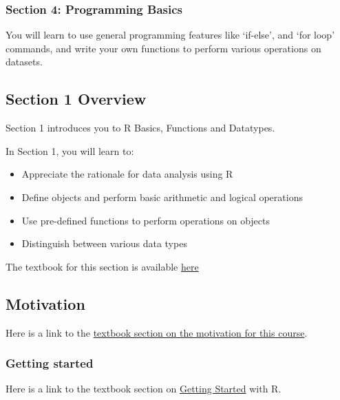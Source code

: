 \documentclass[
]{article}
\providecommand{\tightlist}{%
  \setlength{\itemsep}{0pt}\setlength{\parskip}{0pt}}
\begin{document}
\hypertarget{section-4-programming-basics}{%
\subsubsection{Section 4: Programming
Basics}\label{section-4-programming-basics}}

You will learn to use general programming features like `if-else', and
`for loop' commands, and write your own functions to perform various
operations on datasets.

\hypertarget{section-1-overview}{%
\subsection{Section 1 Overview}\label{section-1-overview}}

Section 1 introduces you to R Basics, Functions and Datatypes.

In Section 1, you will learn to:

\begin{itemize}
\tightlist
\item
  Appreciate the rationale for data analysis using R
\item
  Define objects and perform basic arithmetic and logical operations
\item
  Use pre-defined functions to perform operations on objects
\item
  Distinguish between various data types
\end{itemize}

The textbook for this section is available
\href{https://rafalab.github.io/dsbook/r-basics.html}{here}

\hypertarget{motivation}{%
\subsection{Motivation}\label{motivation}}

Here is a link to the
\href{https://rafalab.github.io/dsbook/r-basics.html\#case-study-us-gun-murders}{textbook
section on the motivation for this course}.

\hypertarget{getting-started}{%
\subsubsection{Getting started}\label{getting-started}}

Here is a link to the textbook section on
\href{https://rafalab.github.io/dsbook/getting-started.html}{Getting
Started} with R.
\end{document}
